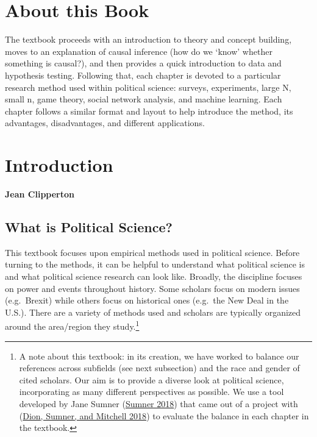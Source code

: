 \documentclass{book}
\begin{document}
\chapter*{About this Book}
The textbook proceeds with an introduction to theory and concept building,
moves to an explanation of causal inference (how do we `know' whether
something is causal?), and then provides a quick introduction to data and
hypothesis testing. Following that, each chapter is devoted to a particular
research method used within political science: surveys, experiments, large N,
small n, game theory, social network analysis, and machine learning. Each
chapter follows a similar format and layout to help introduce the method, its
advantages, disadvantages, and different applications.

\setcounter{tocdepth}{3}
\tableofcontents

\mainmatter

\hypertarget{introduction}{%
\chapter{Introduction}\label{introduction}}

\textbf{Jean Clipperton}

\hypertarget{what-is-political-science}{%
\section{What is Political Science?}\label{what-is-political-science}}

This textbook focuses upon empirical methods used in political science. Before
turning to the methods, it can be helpful to understand what political science
is and what political science research can look like. Broadly, the discipline
focuses on power and events throughout history. Some scholars focus on modern
issues (e.g.~Brexit) while others focus on historical ones (e.g.~the New Deal
in the U.S.). There are a variety of methods used and scholars are typically
organized around the area/region they study.\footnote{A note about this
  textbook: in its creation, we have worked to balance our references across
  subfields (see next subsection) and the race and gender of cited scholars.
  Our aim is to provide a diverse look at political science, incorporating as
  many different perspectives as possible. We use a tool developed by Jane
  Sumner (\protect\hyperlink{ref-sumner_2018}{Sumner 2018}) that came out of a
  project with (\protect\hyperlink{ref-dion_sumner_mitchell_2018}{Dion,
  Sumner, and Mitchell 2018}) to evaluate the balance in each chapter in the
  textbook.}
\end{document}
